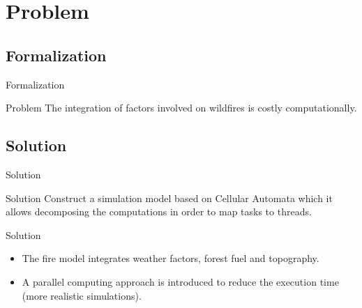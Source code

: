 \documentclass{beamer}
\begin{document}
   
  \section{Problem}    
    \subsection{Formalization}
      
      \begin{frame}{Formalization}
        \begin{block}{Problem}
          The integration of factors involved on wildfires is costly computationally.
        \end{block}
      \end{frame}
      
      
    \subsection{Solution}

      \begin{frame}{Solution}
        \begin{block}{Solution}
          Construct a simulation model based on Cellular Automata which it allows
          decomposing the computations in order to map tasks to threads.
        \end{block}
      \end{frame}

      \begin{frame}{Solution}
        \begin{itemize}
          \item<1-> The fire model integrates weather factors, forest fuel and topography. %
          \item<2-> A parallel computing approach is introduced to reduce the execution time (more realistic simulations).

        \end{itemize}
      \end{frame}
      
\end{document}
